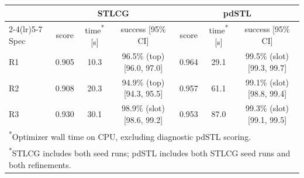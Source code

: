 \begin{tabular}{lcccccc}
\toprule
 & \multicolumn{3}{c}{STLCG} & \multicolumn{3}{c}{pdSTL} \\
\cmidrule(lr){2-4}\cmidrule(lr){5-7}
Spec & score & time\textsuperscript{*} [s] & success [95\% CI] & score & time\textsuperscript{*} [s] & success [95\% CI] \\
\midrule
R1 & 0.905 & 10.3 & 96.5\% (top) [96.0, 97.0] & 0.964 & 29.1 & 99.5\% (slot) [99.3, 99.7] \\
R2 & 0.908 & 20.3 & 94.9\% (top) [94.3, 95.5] & 0.957 & 61.1 & 99.1\% (slot) [98.8, 99.4] \\
R3 & 0.930 & 30.1 & 98.9\% (slot) [98.6, 99.2] & 0.953 & 87.0 & 99.3\% (slot) [99.1, 99.5] \\
\bottomrule
\multicolumn{7}{l}{\footnotesize\textsuperscript{*}Optimizer wall time on CPU, excluding diagnostic pdSTL scoring.} \\
\multicolumn{7}{l}{\footnotesize\textsuperscript{*}STLCG includes both seed runs; pdSTL includes both STLCG seed runs and both refinements.} \\
\end{tabular}

